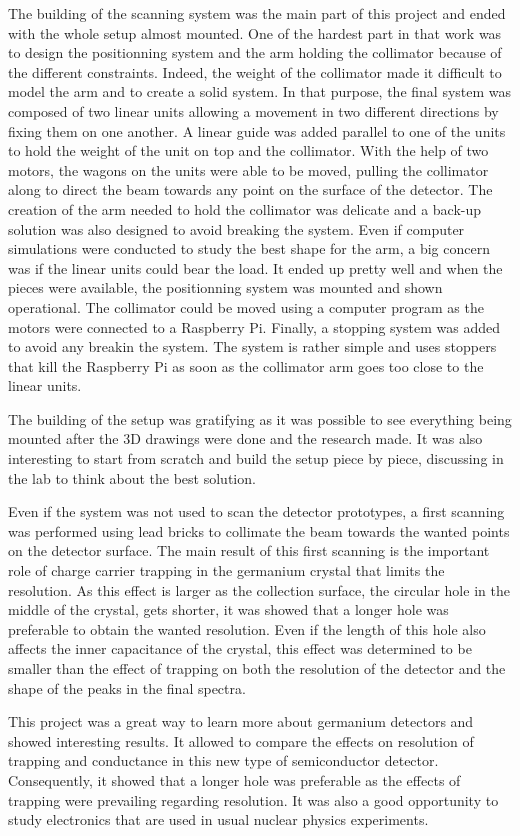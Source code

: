 \documentclass[11pt,a4paper]{article}
\begin{document}
The building of the scanning system was the main part of this project and ended with the whole setup almost mounted. One of the hardest part in that work was to design the positionning system and the arm holding the collimator because of the different constraints. Indeed, the weight of the collimator made it difficult to model the arm and to create a solid system. In that purpose, the final system was composed of two linear units allowing a movement in two different directions by fixing them on one another. A linear guide was added parallel to one of the units to hold the weight of the unit on top and the collimator. With the help of two motors, the wagons on the units were able to be moved, pulling the collimator along to direct the beam towards any point on the surface of the detector. The creation of the arm needed to hold the collimator was delicate and a back-up solution was also designed to avoid breaking the system. Even if computer simulations were conducted to study the best shape for the arm, a big concern was if the linear units could bear the load. It ended up pretty well and when the pieces were available, the positionning system was mounted and shown operational. The collimator could be moved using a computer program as the motors were connected to a Raspberry Pi. Finally, a stopping system was added to avoid any breakin the system. The system is rather simple and uses stoppers that kill the Raspberry Pi as soon as the collimator arm goes too close to the linear units.

The building of the setup was gratifying as it was possible to see everything being mounted after the 3D drawings were done and the research made. It was also interesting to start from scratch and build the setup piece by piece, discussing in the lab to think about the best solution.

Even if the system was not used to scan the detector prototypes, a first scanning was performed using lead bricks to collimate the beam towards the wanted points on the detector surface. The main result of this first scanning is the important role of charge carrier trapping in the germanium crystal that limits the resolution. As this effect is larger as the collection surface, the circular hole in the middle of the crystal, gets shorter, it was showed that a longer hole was preferable to obtain the wanted resolution. Even if the length of this hole also affects the inner capacitance of the crystal, this effect was determined to be smaller than the effect of trapping on both the resolution of the detector and the shape of the peaks in the final spectra.

This project was a great way to learn more about germanium detectors and showed interesting results. It allowed to compare the effects on resolution of trapping and conductance in this new type of semiconductor detector. Consequently, it showed that a longer hole was preferable as the effects of trapping were prevailing regarding resolution. It was also a good opportunity to study electronics that are used in usual nuclear physics experiments.

\newpage



\end{document}
